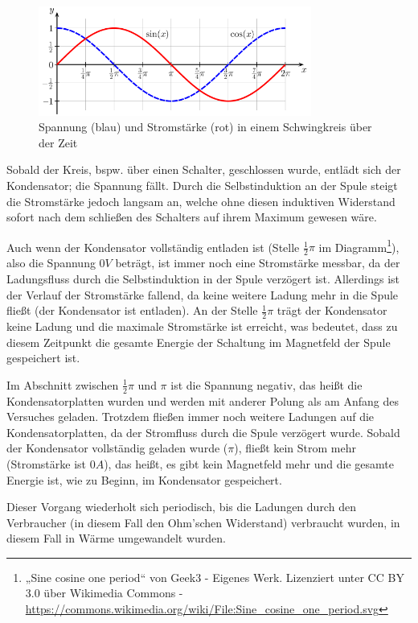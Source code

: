 \begin{figure}[h!]
	\centering
	\includegraphics[width=0.8\textwidth]{Pictures/SchwingkreisGraph}
	\caption{Spannung (blau) und Stromstärke (rot) in einem Schwingkreis über der Zeit}
\end{figure}

Sobald der Kreis, bspw. über einen Schalter, geschlossen wurde, entlädt sich der Kondensator; die Spannung fällt. Durch die Selbstinduktion an der Spule steigt die Stromstärke jedoch langsam an, welche ohne diesen induktiven Widerstand sofort nach dem schließen des Schalters auf ihrem Maximum gewesen wäre.

Auch wenn der Kondensator vollständig entladen ist (Stelle $\frac{1}{2}\pi$ im Diagramm\footnote{„Sine cosine one period“ von Geek3 - Eigenes Werk. Lizenziert unter CC BY 3.0 über Wikimedia Commons - \url{https://commons.wikimedia.org/wiki/File:Sine_cosine_one_period.svg}}), also die Spannung $0V$ beträgt, ist immer noch eine Stromstärke messbar, da der Ladungsfluss durch die Selbstinduktion in der Spule verzögert ist. Allerdings ist der Verlauf der Stromstärke fallend, da keine weitere Ladung mehr in die Spule fließt (der Kondensator ist entladen). An der Stelle $\frac{1}{2}\pi$ trägt der Kondensator keine Ladung und die maximale Stromstärke ist erreicht, was bedeutet, dass zu diesem Zeitpunkt die gesamte Energie der Schaltung im Magnetfeld der Spule gespeichert ist.

Im Abschnitt zwischen $\frac{1}{2}\pi$ und $\pi$ ist die Spannung negativ, das heißt die Kondensatorplatten wurden und werden mit anderer Polung als am Anfang des Versuches geladen. Trotzdem fließen immer noch weitere Ladungen auf die Kondensatorplatten, da der Stromfluss durch die Spule verzögert wurde. Sobald der Kondensator vollständig geladen wurde ($\pi$), fließt kein Strom mehr (Stromstärke ist $0A$), das heißt, es gibt kein Magnetfeld mehr und die gesamte Energie ist, wie zu Beginn, im Kondensator gespeichert.

Dieser Vorgang wiederholt sich periodisch, bis die Ladungen durch den Verbraucher (in diesem Fall den Ohm'schen Widerstand) verbraucht wurden, in diesem Fall in Wärme umgewandelt wurden.

